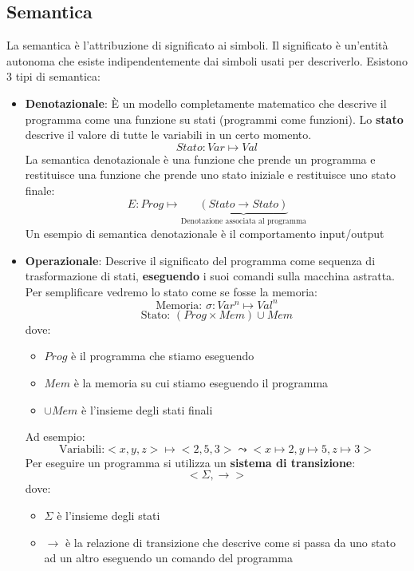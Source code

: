 \documentclass[a4paper]{article}
\begin{document}
\subsection{Semantica}
La semantica è l'attribuzione di significato ai simboli.
Il significato è un'entità autonoma che esiste indipendentemente dai simboli
usati per descriverlo. Esistono 3 tipi di semantica:
\begin{itemize}
  \item \textbf{Denotazionale}: È un modello completamente matematico che descrive il
    programma come una funzione su stati (programmi come funzioni). Lo \textbf{stato}
    descrive il valore di tutte le variabili in un certo momento.
    \[
      Stato: Var \mapsto Val
    \] 
    La semantica denotazionale è una funzione che prende un programma e restituisce
    una funzione che prende uno stato iniziale e restituisce uno stato finale:
    \[
      E: Prog \mapsto \underbrace{(Stato \to Stato)}_{\text{Denotazione associata al programma}}
    \] 
    Un esempio di semantica denotazionale è il comportamento input/output

  \item \textbf{Operazionale}: Descrive il significato del programma come sequenza
    di trasformazione di stati, \textbf{eseguendo} i suoi comandi sulla macchina astratta.
    Per semplificare vedremo lo stato come se fosse la memoria:
    \[
      \text{Memoria: } \sigma: Var^n \mapsto Val^n
    \] 
    \[
      \text{Stato: } (Prog \times Mem) \cup Mem
    \] 
    dove:
    \begin{itemize}
      \item \( Prog \) è il programma che stiamo eseguendo
      \item \( Mem \) è la memoria su cui stiamo eseguendo il programma
      \item \( \cup Mem \) è l'insieme degli stati finali
    \end{itemize}
    Ad esempio:
    \[
      \text{Variabili:} <x, y, z> \mapsto <2, 5, 3>
      \leadsto <x \mapsto 2, y \mapsto 5, z \mapsto 3>
    \] 
    Per eseguire un programma si utilizza un \textbf{sistema di transizione}:
    \[
      <\Sigma, \to>
    \] 
    dove:
    \begin{itemize}
      \item \( \Sigma \) è l'insieme degli stati
      \item \( \to \) è la relazione di transizione che descrive come si passa da
        uno stato ad un altro eseguendo un comando del programma
    \end{itemize}


\end{itemize}
\end{document}
